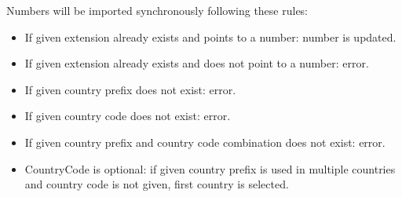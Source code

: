 \documentclass[letterpaper,10pt,english]{sphinxmanual}
\begin{document}
Numbers will be imported synchronously following these rules:
\begin{itemize}
\item {} 
If given extension already exists and points to a number: number is updated.

\item {} 
If given extension already exists and does not point to a number: error.

\item {} 
If given country prefix does not exist: error.

\item {} 
If given country code does not exist: error.

\item {} 
If given country prefix and country code combination does not exist: error.

\item {} 
CountryCode is optional: if given country prefix is used in multiple countries
and country code is not given, first country is selected.

\end{itemize}
\end{document}
